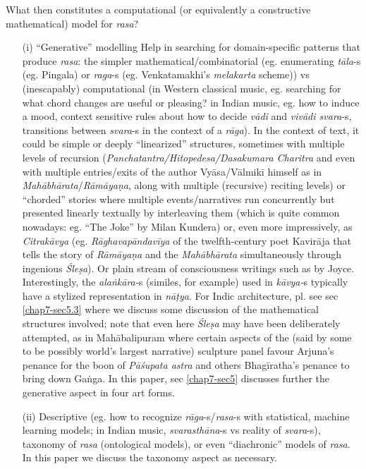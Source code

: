 What then constitutes a computational (or equivalently a constructive mathematical) model for \textsl{rasa}?
\begin{itemize}
\item[(i)] “Generative” modelling Help in searching for domain-specific patterns that produce \textsl{rasa}: the simpler mathematical/combinatorial (eg. enumerating \textsl{tāla}-s (eg. Pingala) or \textsl{raga}-s (eg. Venkatamakhi’s \textsl{melakarta} scheme)) vs (inescapably) computational (in Western classical music, eg. searching for what chord changes are useful or pleasing? in Indian music, eg. how to induce a mood, context sensitive rules about how to decide \textsl{vādi} and \textsl{vivādi svara}-s, transitions between \textsl{svara}-s in the context of a \textsl{rāga}). In the context of text, it could be simple or deeply “linearized” structures, sometimes with multiple levels of recursion (\textsl{Panchatantra/Hitopedesa/Dasakumara Charitra }and even with multiple entries/exits of the author Vyāsa/Vālmikī himself as in \textsl{Mahābhārata}/\textsl{Rāmāyaṇa}, along with multiple (recursive) reciting levels) or “chorded” stories where multiple events/narratives run concurrently but presented linearly textually by interleaving them (which is quite common nowadays: eg. “The Joke” by Milan Kundera) or, even more impressively, as \textsl{Citrakāvya} (eg. \textsl{Rāghavapāndavīya} of the twelfth-century poet Kavirāja that tells the story of \textsl{Rāmāyaṇa} and the \textsl{Mahābhārata} simultaneously through ingenious \textsl{Śleṣa}). Or plain stream of consciousness writings such as by Joyce. Interestingly, the \textsl{alaṅkāra-}s (similes, for example) used in \textsl{kāvya-}s typically have a stylized representation in \textsl{nāṭya}. For Indic architecture, pl. see sec \ref{chap7-sec5.3} where we discuss some discussion of the mathematical structures involved; note that even here \textsl{Śleṣa} may have been deliberately attempted, as in Mahābalipuram where certain aspects of the (said by some to be possibly world's largest narrative) sculpture panel favour Arjuna’s penance for the boon of \textsl{Pāśupata astra} and others Bhagīratha’s penance to bring down Gaṅga. In this paper, sec \ref{chap7-sec5} discusses further the generative aspect in four art forms.

\item[(ii)] Descriptive (eg. how to recognize \textsl{rāga}-s/\textsl{rasa}-s with statistical, machine learning models; in Indian music, \textsl{svarasthāna}-s vs reality of \textsl{svara}-s), taxonomy of \textsl{rasa} (ontological models), or even “diachronic” models of \textsl{rasa}. In this paper we discuss the taxonomy aspect as necessary.


\end{itemize}
